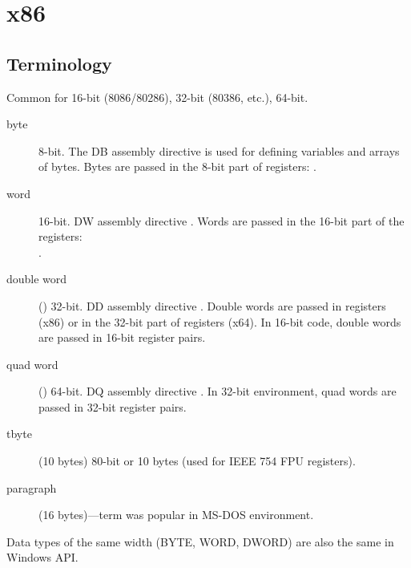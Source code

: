 \section{x86}

\subsection{Terminology}

Common for 16-bit (8086/80286), 32-bit (80386, etc.), 64-bit.

\begin{description}
	\item[byte] 8-bit.
		The DB assembly directive is used for defining variables and arrays of bytes.
		Bytes are passed in the 8-bit part of registers: .
	\item[word] 16-bit. 
		DW assembly directive \dittoclosing.
		Words are passed in the 16-bit part of the registers:\\
			.
	\item[double word] () 32-bit.
		DD assembly directive \dittoclosing.
		Double words are passed in registers (x86) or in the 32-bit part of registers (x64). 
		In 16-bit code, double words are passed in 16-bit register pairs.
	\item[quad word] () 64-bit.
		DQ assembly directive \dittoclosing.
		In 32-bit environment, quad words are passed in 32-bit register pairs.
	\item[tbyte] (10 bytes) 80-bit or 10 bytes (used for IEEE 754 FPU registers).
	\item[paragraph] (16 bytes)---term was popular in MS-DOS environment.
\end{description}


Data types of the same width (BYTE, WORD, DWORD) are also the same in Windows \ac{API}.


